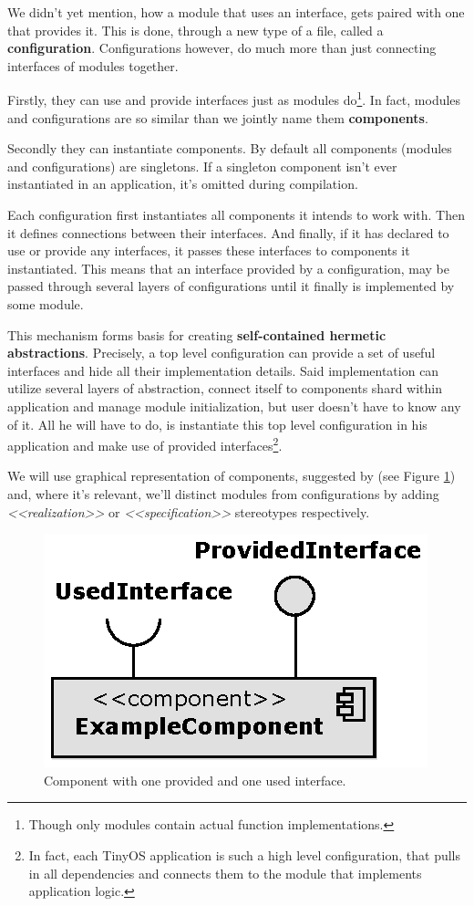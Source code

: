 We didn't yet mention, how a module that uses an interface, gets
paired with one that provides it. This is done, through a new type of
a file, called a {\bf configuration}. Configurations however, do much
more than just connecting interfaces of modules together.

Firstly, they can use and provide interfaces just as modules
do\footnote{Though only modules contain actual function
implementations.}. In fact, modules and configurations are so similar
than we jointly name them {\bf components}.

Secondly they can instantiate components. By default all components
(modules and configurations) are singletons. If a singleton component
isn't ever instantiated in an application, it's omitted during compilation.

Each configuration first instantiates all components it intends to
work with. Then it defines connections between their interfaces. And
finally, if it has declared to use or provide any interfaces, it passes
these interfaces to components it instantiated.  This means that an
interface provided by a configuration, may be passed through several
layers of configurations until it finally is implemented by some
module.

This mechanism forms basis for creating {\bf self-contained hermetic
abstractions}. Precisely, a top level configuration can provide a set of
useful interfaces and hide all their implementation details. Said
implementation can utilize several layers of abstraction, connect
itself to components shard within application and manage module
initialization, but user doesn't have to know any of it. All he will
have to do, is instantiate this top level configuration in his
application and make use of provided interfaces\footnote{In fact, each
TinyOS application is such a high level configuration, that pulls in
all dependencies and connects them to the module that implements
application logic.}.

We will use graphical representation of components, suggested by
\cite{Bachmaier} (see Figure \ref{fig:example_component}) and, where
it's relevant, we'll distinct modules from configurations by adding
\emph{<<realization>>} or \emph{<<specification>>} stereotypes
respectively.

\begin{figure}[h]
  \centering
  \includegraphics{diagrams/example_component.eps}
  \caption{Component with one provided and one used interface.}
  \label{fig:example_component}
\end{figure}

